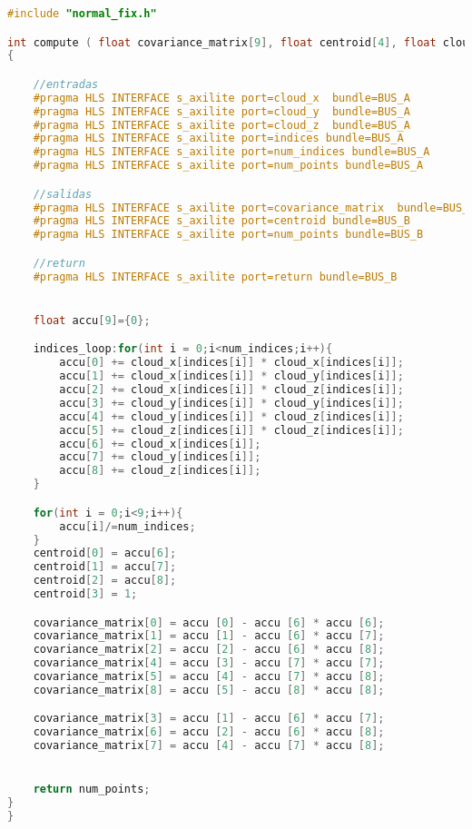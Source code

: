 \begin{lstlisting}[language=C++,breaklines]
 #include "normal_fix.h"

int compute ( float covariance_matrix[9], float centroid[4], float cloud_x[MAXPOINTS], float cloud_y[MAXPOINTS], float cloud_z[MAXPOINTS],int indices[MAXINDICES], int num_points, int num_indices)
{

	//entradas
	#pragma HLS INTERFACE s_axilite port=cloud_x  bundle=BUS_A
	#pragma HLS INTERFACE s_axilite port=cloud_y  bundle=BUS_A
	#pragma HLS INTERFACE s_axilite port=cloud_z  bundle=BUS_A
	#pragma HLS INTERFACE s_axilite port=indices bundle=BUS_A
	#pragma HLS INTERFACE s_axilite port=num_indices bundle=BUS_A
	#pragma HLS INTERFACE s_axilite port=num_points bundle=BUS_A

	//salidas
	#pragma HLS INTERFACE s_axilite port=covariance_matrix  bundle=BUS_B
	#pragma HLS INTERFACE s_axilite port=centroid bundle=BUS_B
	#pragma HLS INTERFACE s_axilite port=num_points bundle=BUS_B

	//return
	#pragma HLS INTERFACE s_axilite port=return bundle=BUS_B


	float accu[9]={0};

	indices_loop:for(int i = 0;i<num_indices;i++){
		accu[0] += cloud_x[indices[i]] * cloud_x[indices[i]];
		accu[1] += cloud_x[indices[i]] * cloud_y[indices[i]];
		accu[2] += cloud_x[indices[i]] * cloud_z[indices[i]];
		accu[3] += cloud_y[indices[i]] * cloud_y[indices[i]];
		accu[4] += cloud_y[indices[i]] * cloud_z[indices[i]];
		accu[5] += cloud_z[indices[i]] * cloud_z[indices[i]];
		accu[6] += cloud_x[indices[i]];
		accu[7] += cloud_y[indices[i]];
		accu[8] += cloud_z[indices[i]];
	}

	for(int i = 0;i<9;i++){
		accu[i]/=num_indices;
	}
	centroid[0] = accu[6];
	centroid[1] = accu[7];
	centroid[2] = accu[8];
	centroid[3] = 1;

	covariance_matrix[0] = accu [0] - accu [6] * accu [6];
	covariance_matrix[1] = accu [1] - accu [6] * accu [7];
	covariance_matrix[2] = accu [2] - accu [6] * accu [8];
	covariance_matrix[4] = accu [3] - accu [7] * accu [7];
	covariance_matrix[5] = accu [4] - accu [7] * accu [8];
	covariance_matrix[8] = accu [5] - accu [8] * accu [8];

	covariance_matrix[3] = accu [1] - accu [6] * accu [7];
	covariance_matrix[6] = accu [2] - accu [6] * accu [8];
	covariance_matrix[7] = accu [4] - accu [7] * accu [8];


	return num_points;
}
}
\end{lstlisting}

